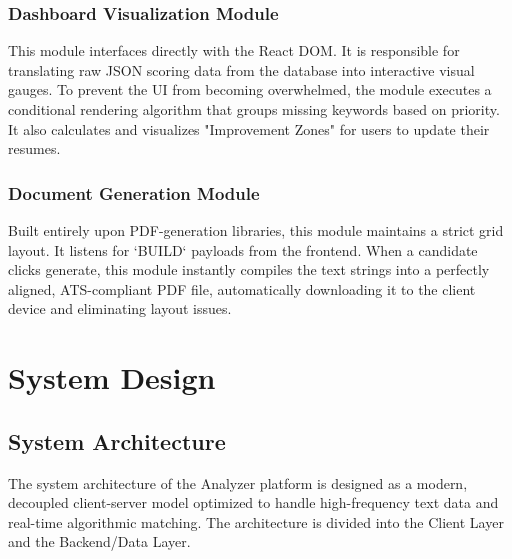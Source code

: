 \documentclass[12pt,a4paper]{report}
\begin{document}
\subsection{Dashboard Visualization Module}
This module interfaces directly with the React DOM. It is responsible for translating raw JSON scoring data from the database into interactive visual gauges. To prevent the UI from becoming overwhelmed, the module executes a conditional rendering algorithm that groups missing keywords based on priority. It also calculates and visualizes "Improvement Zones" for users to update their resumes.

\subsection{Document Generation Module}
Built entirely upon PDF-generation libraries, this module maintains a strict grid layout. It listens for `BUILD` payloads from the frontend. When a candidate clicks generate, this module instantly compiles the text strings into a perfectly aligned, ATS-compliant PDF file, automatically downloading it to the client device and eliminating layout issues.

\chapter{System Design}

\section{System Architecture}

The system architecture of the Analyzer platform is designed as a modern, decoupled client-server model optimized to handle high-frequency text data and real-time algorithmic matching. The architecture is divided into the Client Layer and the Backend/Data Layer.
\end{document}
